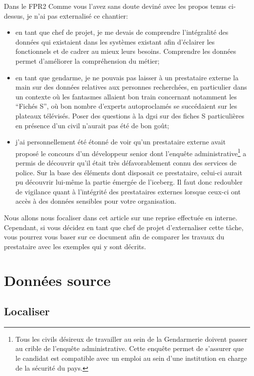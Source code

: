 \documentclass{book}
\begin{document}
\begin{bclogo}[arrondi = 0.1, couleur = blue!10, logo = \bcinfo]{Dans le FPR2}
Comme vous l'avez sans doute deviné avec les propos tenus ci-dessus, je n'ai pas externalisé ce chantier:
\begin{itemize}
 \item en tant que chef de projet, je me devais de comprendre l'intégralité des données qui existaient dans les systèmes existant afin d'éclairer les \gls{fonctionnels} et de cadrer au mieux leurs besoins. Comprendre les données permet d'améliorer la compréhension du métier;
 \item en tant que gendarme, je ne pouvais pas laisser à un prestataire externe la main sur des données relatives aux personnes recherchées, en particulier dans un contexte où les fantasmes allaient bon train concernant notamment les ``Fichés S'', où bon nombre d'experts autoproclamés se succédaient sur les plateaux télévisés. Poser des questions à la \gls{dgsi} sur des fiches S particulières en présence d'un civil n'aurait pas été de bon goût;
 \item j'ai personnellement été étonné de voir qu'un prestataire externe avait proposé le concours d'un développeur senior dont l'enquête administrative\footnote{Tous les civils désireux de travailler au sein de la Gendarmerie doivent passer au crible de l'enquête administrative. Cette enquête permet de s'assurer que le candidat est compatible avec un emploi au sein d'une institution en charge de la sécurité du pays.} a permis de découvrir qu'il était très défavorablement connu des services de police. Sur la base des éléments dont disposait ce prestataire, celui-ci aurait pu découvrir lui-même la partie émergée de l'iceberg. Il faut donc redoubler de vigilance quant à l'intégrité des prestataires externes lorsque ceux-ci ont accès à des données sensibles pour votre organisation.
\end{itemize}
\end{bclogo}

Nous allons nous focaliser dans cet article sur une reprise effectuée en interne. Cependant, si vous décidez en tant que chef de projet d'externaliser cette tâche, vous pourrez vous baser sur ce document afin de comparer les travaux du prestataire avec les exemples qui y sont décrits.

\chapter{Données source}
\section{Localiser}
\end{document}

